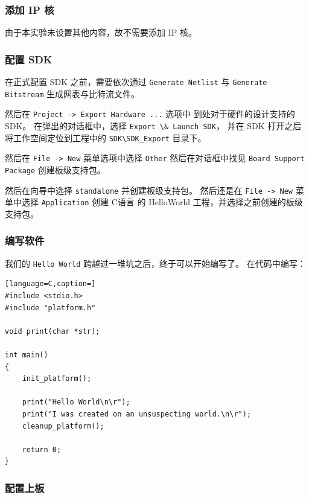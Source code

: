 \documentclass{ctexart}
\begin{document}
        \subsubsection{添加 IP 核}
        
        由于本实验未设置其他内容，故不需要添加 IP 核。
        
        \subsubsection{配置 SDK}
        
        在正式配置 SDK 之前，需要依次通过 
        \verb|Generate Netlist| 与 \verb|Generate Bitstream|
        生成网表与比特流文件。
        
        然后在 \verb|Project -> Export Hardware ...| 选项中
        到处对于硬件的设计支持的 SDK。
        在弹出的对话框中，选择 \verb|Export \& Launch SDK|，
        并在 SDK 打开之后将工作空间定位到工程中的
        \verb|SDK\SDK_Export| 目录下。
        
        然后在 \verb|File -> New| 菜单选项中选择 \verb|Other|
        然后在对话框中找见 \verb|Board Support Package|
        创建板级支持包。

        然后在向导中选择 \verb|standalone| 并创建板级支持包。
        然后还是在 \verb|File -> New| 菜单中选择 \verb|Application|
        创建 C语言 的 HelloWorld 工程，并选择之前创建的板级支持包。
        
        \subsubsection{编写软件}
        
        我们的 \verb|Hello World| 跨越过一堆坑之后，终于可以开始编写了。
        在代码中编写：
        
        \begin{lstlisting}[language=C,caption=]
#include <stdio.h>
#include "platform.h"

void print(char *str);

int main()
{
    init_platform();

    print("Hello World\n\r");
    print("I was created on an unsuspecting world.\n\r");
    cleanup_platform();

    return 0;
}
        \end{lstlisting}

        \subsubsection{配置上板}
        
\end{document}
